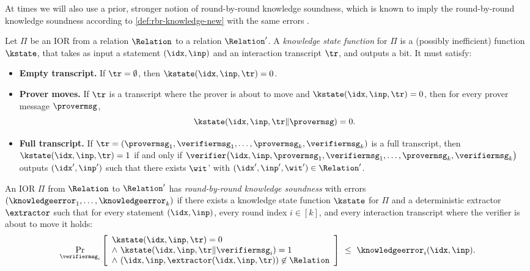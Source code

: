 At times we will also use a prior, stronger notion of round-by-round knowledge soundness, which is known to imply the round-by-round knowledge soundness according to \cref{def:rbr-knowledge-new} with the same errors \cite{BCFW25}.

\begin{definition}
\label{def:knowledge-state-function-strong}
Let $\Pi$ be an IOR from a relation $\Relation$ to a relation $\Relation'$.
A \emph{knowledge state function} for $\Pi$ is a (possibly inefficient) function $\kstate$, that takes as input a statement $(\idx,\inp)$ and an interaction transcript $\tr$, and outputs a bit. It must satisfy:
\begin{itemize}[nosep]
  \item \textbf{Empty transcript.} If $\tr=\emptyset$, then $\kstate(\idx,\inp,\tr)=0$.
  \item \textbf{Prover moves.} If $\tr$ is a transcript where the prover is about to move and $\kstate(\idx,\inp,\tr)=0$, then for every prover message $\provermsg$,
  \[
    \kstate(\idx,\inp,\tr\Vert \provermsg)=0.
  \]
  \item \textbf{Full transcript.} If $\tr=(\provermsg_1,\verifiermsg_1,\dots,\provermsg_k,\verifiermsg_k)$ is a full transcript, then $\kstate(\idx,\inp,\tr)=1$ if and only if $\verifier\bigl(\idx,\inp,\provermsg_1,\verifiermsg_1,\dots,\provermsg_k,\verifiermsg_k\bigr)$ outputs $(\idx',\inp')$ such that there exists $\wit$' with $(\idx',\inp',\wit')\in \Relation'$.
\end{itemize}
\end{definition}

\begin{definition}
\label{def:rbr-knowledge}
An IOR $\Pi$ from $\Relation$ to $\Relation'$ has \emph{round-by-round knowledge soundness} with errors $(\knowledgeerror_1,\dots,\knowledgeerror_k)$
if there exists a knowledge state function $\kstate$ for $\Pi$ and a deterministic extractor $\extractor$ such that for every statement $(\idx,\inp)$, every round index $i\in[k]$, and every interaction transcript where the verifier is about to move it holds:
\[
  \Pr_{\verifiermsg_i}\left[
    \begin{array}{l}
    \kstate(\idx,\inp,\tr)=0 \\
    \wedge\ \kstate(\idx,\inp,\tr\Vert\verifiermsg_i)=1 \\
    \wedge\ (\idx,\inp,\extractor(\idx,\inp,\tr)) \not\in \Relation
    \end{array}
  \right]
  \ \le\ \knowledgeerror_i(\idx,\inp).
\]
\end{definition}

